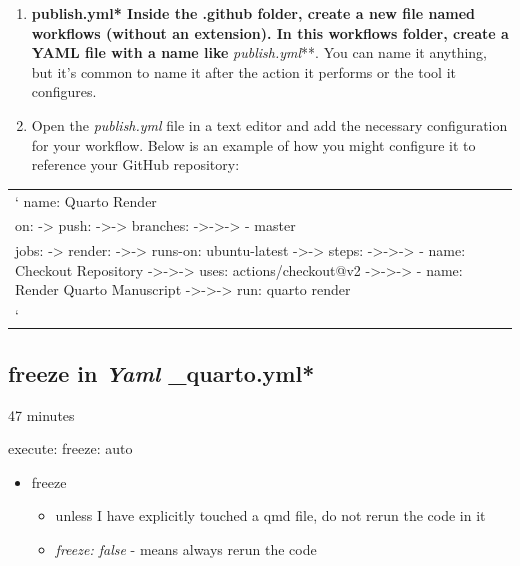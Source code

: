 \documentclass[
  letterpaper,
  DIV=11,
  numbers=noendperiod]{scrartcl}
\providecommand{\tightlist}{%
  \setlength{\itemsep}{0pt}\setlength{\parskip}{0pt}}\usepackage{longtable,booktabs,array}
\begin{document}
\begin{enumerate}
\def\labelenumi{\arabic{enumi}.}
\item
  \textbf{publish.yml* Inside the .github folder, create a new file
  named workflows (without an extension). In this workflows folder,
  create a YAML file with a name like }\emph{publish.yml}**. You can
  name it anything, but it's common to name it after the action it
  performs or the tool it configures.
\item
  Open the \emph{publish.yml} file in a text editor and add the
  necessary configuration for your workflow. Below is an example of how
  you might configure it to reference your GitHub repository:
\end{enumerate}

\begin{longtable}[]{@{}
  >{\raggedright\arraybackslash}p{}@{}}
\toprule\noalign{}
\endhead
\bottomrule\noalign{}
\endlastfoot
` name: Quarto Render \\
on: -\textgreater{} push: -\textgreater-\textgreater{} branches:
-\textgreater-\textgreater-\textgreater{} - master \\
jobs: -\textgreater{} render: -\textgreater-\textgreater{} runs-on:
ubuntu-latest -\textgreater-\textgreater{} steps:
-\textgreater-\textgreater-\textgreater{} - name: Checkout Repository
-\textgreater-\textgreater-\textgreater{} uses: actions/checkout@v2
-\textgreater-\textgreater-\textgreater{} - name: Render Quarto
Manuscript -\textgreater-\textgreater-\textgreater{} run: quarto
render \\
` \\
\end{longtable}

\subsection{\texorpdfstring{freeze in \emph{Yaml}
\_quarto.yml*}{freeze in Yaml \_quarto.yml*}}\label{freeze-in-yaml-_quarto.yml}

47 minutes

execute: freeze: auto

\begin{itemize}
\tightlist
\item
  freeze

  \begin{itemize}
  \tightlist
  \item
    unless I have explicitly touched a qmd file, do not rerun the code
    in it
  \item
    \emph{freeze: false} - means always rerun the code
  \end{itemize}
\end{itemize}
\end{document}
